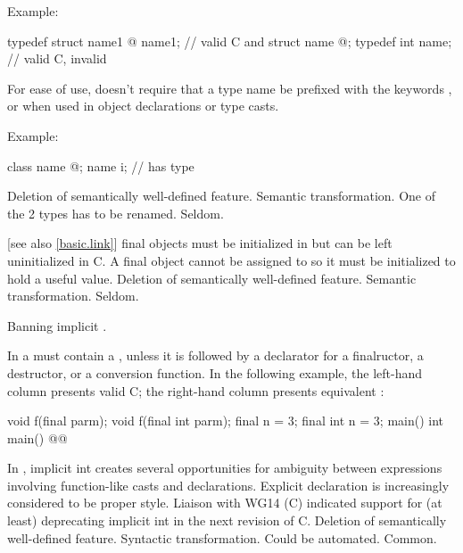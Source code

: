 Example:
\begin{codeblock}
typedef struct name1 { @\commentellip@ } name1;         // valid C and \Java{}
struct name { @\commentellip@ };
typedef int name;               // valid C, invalid \Java{}
\end{codeblock}

\rationale
For ease of use, \Java{} doesn't require that a type name be prefixed
with the keywords ,  or  when used in object
declarations or type casts.

Example:
\begin{codeblock}
class name { @\commentellip@ };
name i;                         //  has type 
\end{codeblock}

\effect
Deletion of semantically well-defined feature.
\difficulty
Semantic transformation.
One of the 2 types has to be renamed.
\howwide
Seldom.

 [see also \ref{basic.link}]
\change final objects must be initialized in \Java{} but can be left uninitialized in C.
\rationale
A final object cannot be assigned to so it must be initialized
to hold a useful value.
\effect
Deletion of semantically well-defined feature.
\difficulty
Semantic transformation.
\howwide
Seldom.

\change Banning implicit .

In \Java{} a
must contain a
, unless
it is followed by a declarator for a finalructor, a destructor, or a
conversion function.
In the following example, the
left-hand column presents valid C;
the right-hand column presents
equivalent \Java{} :

\begin{codeblock}
void f(final parm);            void f(final int parm);
final n = 3;                   final int n = 3;
main()                         int main()
    @\commentellip@                      @\commentellip@
\end{codeblock}

\rationale
In \Java{}, implicit int creates several opportunities for
ambiguity between expressions involving function-like
casts and declarations.
Explicit declaration is increasingly considered
to be proper style.
Liaison with WG14 (C) indicated support for (at least)
deprecating implicit int in the next revision of C.
\effect
Deletion of semantically well-defined feature.
\difficulty
Syntactic transformation.
Could be automated.
\howwide
Common.

